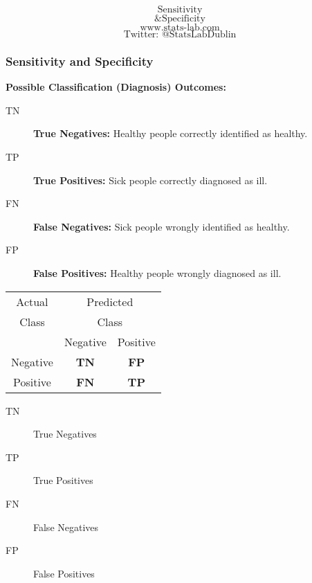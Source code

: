 \documentclass{beamer}
\begin{document}
\begin{frame}
\bigskip
{
\Huge
\[ \mbox{Sensitivity} \]
\[ \mbox{\& Specificity} \]
}
{
\LARGE
\[ \mbox{www.stats-lab.com} \]
\[ \mbox{Twitter: @StatsLabDublin} \]
}
\end{frame}
\begin{frame}
\frametitle{Sensitivity and Specificity}
\Large
 \textbf{Possible Classification (Diagnosis) Outcomes:}\\ \bigskip
\begin{description}
\item[TN] \textbf{True Negatives:} Healthy people correctly identified as healthy.
\item[TP] \textbf{True Positives:} Sick people correctly diagnosed as ill.
\item[FN] \textbf{False Negatives:} Sick people wrongly identified as healthy.
\item[FP] \textbf{False Positives:} Healthy people wrongly diagnosed as ill.
\end{description}


\end{frame}

\begin{frame}

{
\LARGE
\centering
\begin{table}[!htbp]

\begin{tabular}{c | *2c }
Actual  & \multicolumn{2}{c}{Predicted}\\
Class  & \multicolumn{2}{c}{Class}\\
\midrule
{}   & Negative & Positive       \\
Negative  &  \textbf{TN} & \textbf{FP}  \\
Positive   &  \textbf{FN} & \textbf{TP}  \\
\end{tabular}
\end{table}
}
\begin{description}
\item[TN] True Negatives
\item[TP] True Positives
\item[FN] False Negatives
\item[FP] False Positives
\end{description}

\end{frame}
\end{document}

